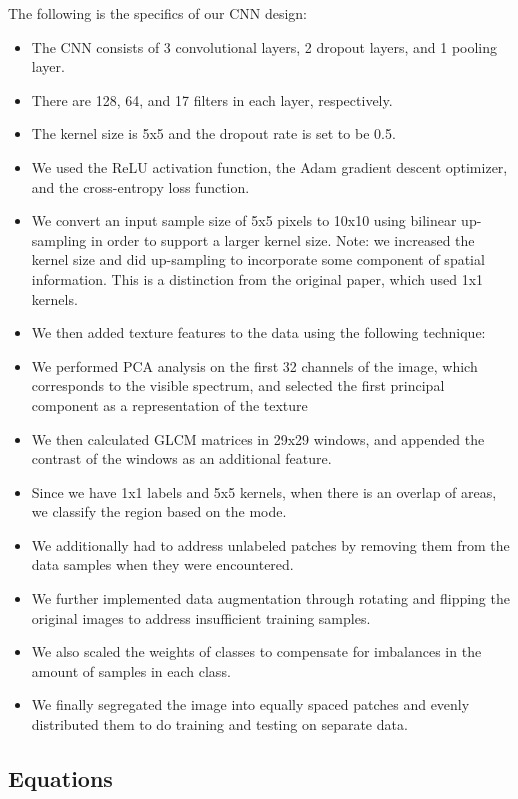 \documentclass[letterpaper, 10 pt, conference]{ieeeconf}  %
\begin{document}
The following is the specifics of our CNN design: 

\begin{itemize}

\item The CNN consists of 3 convolutional layers, 2 dropout layers, and 1 pooling layer. 
\item There are 128, 64, and 17 filters in each layer, respectively. 
\item The kernel size is 5x5 and the dropout rate is set to be 0.5. 
\item We used the ReLU activation function, the Adam gradient descent optimizer, and the cross-entropy loss function. 
\item We convert an input sample size of 5x5 pixels to 10x10 using bilinear up-sampling in order to support a larger kernel size. 
Note: we increased the kernel size and did up-sampling to incorporate some component of spatial information. This is a distinction from the original paper, which used 1x1 kernels. 
\item We then added texture features to the data using the following technique: 
\item We performed PCA analysis on the first 32 channels of the image, which corresponds to the visible spectrum, and selected the first principal component as a representation of the texture
\item We then calculated GLCM matrices in 29x29 windows, and appended the contrast of the windows as an additional feature. 
\item Since we have 1x1 labels and 5x5 kernels, when there is an overlap of areas, we classify the region based on the mode. 
\item We additionally had to address unlabeled patches by removing them from the data samples when they were encountered. 
\item We further implemented data augmentation through rotating and flipping the original images to address insufficient training samples. 
\item We also scaled the weights of classes to compensate for imbalances in the amount of samples in each class. 
\item We finally segregated the image into equally spaced patches and evenly distributed them to do training and testing on separate data. 

\end{itemize}



\subsection{Equations}
\end{document}
